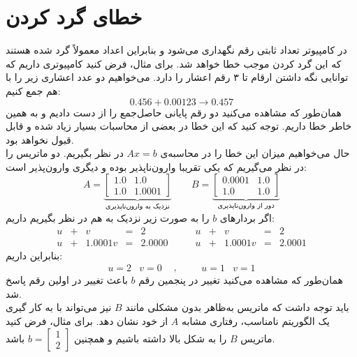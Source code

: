 \section{خطای گرد کردن}
در کامپیوتر تعداد ثابتی رقم نگهداری می‌شود و بنابراین اعداد معمولاً گرد شده هستند که این گرد کردن موجب خطا خواهد شد. برای مثال، فرض کنید کامپیوتری داریم که توانایی نگه داشتن ارقام تا ۳ رقم اعشار را دارد. می‌خواهیم دو عدد اعشاری زیر را با هم جمع کنیم:\\
$$0.456 + 0.00123 \rightarrow{}0.457$$
همان‌طور که مشاهده می‌کنید دو رقم پایانی حاصل‌جمع را از دست دادیم و به همین خاطر خطا داریم. توجه کنید که این خطا در بعضی از محاسبات بسیار زیاد شده و قابل قبول نخواهد بود.\\
حال می‌خواهیم میزان این خطا را در محاسبه‌ی $Ax=b$ در نظر بگیریم. دو ماتریس را در نظر می‌گیریم که یکی تقریبا وارون‌ناپذیر بوده و دیگری وارون‌پذیر است:\\
\[A=\underbrace{\begin{bmatrix}
	1.0 & 1.0\\ 1.0 & 1.0001
	\end{bmatrix}}_{\text{نزدیک به ‌وارون‌ناپذیری}}
\qquad
B=\underbrace{\begin{bmatrix}
	0.0001 & 1.0\\ 1.0 & 1.0
	\end{bmatrix}}_{\text{دور از ‌وارون‌ناپذیری}}\]
اگر بردار‌های $b$ را به صورت زیر نزدیک به هم در نظر بگیریم داریم:\\
\[\begin{matrix}
u & + & v       &= &2 \\ 
u & + &1.0001 v &= &2.0000		
\end{matrix}
\qquad
\begin{matrix}
u & + & v &= &2\\ u & + &1.0001 v &= &2.0001
\end{matrix}\]
بنابراین داریم:\\
\[\begin{matrix}
u=2&v=0 &\end{matrix},
\qquad
\begin{matrix}
u=1&v=1 
\end{matrix}
\]
همان‌طور که مشاهده می‌کنید تغییر در پنجمین رقم $b$ باعث تغییر در اولین رقم پاسخ شد.\\
باید توجه داشت که ماتریس به‌ظاهر بدون مشکلی مانند $B$ نیز می‌تواند با به کار گیری یک الگوریتم نامناسب، رفتاری مشابه $A$ از خود نشان دهد. برای مثال، فرض کنید ماتریس $B$ را به شکل بالا داشته باشیم و همچنین \(b =\begin{bmatrix}1\\2\end{bmatrix}\) باشد.\\
